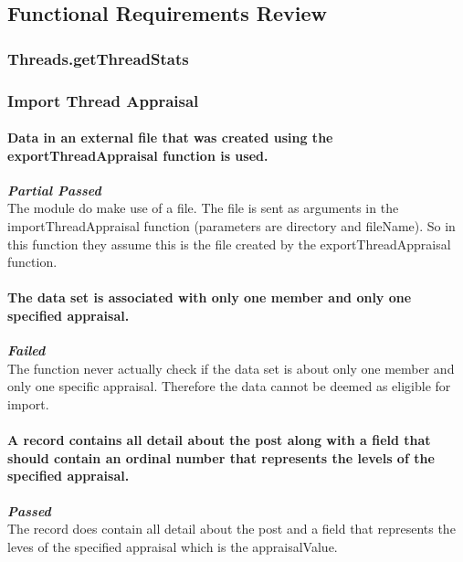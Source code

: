 \subsection{Functional Requirements Review}
\subsubsection{Threads.getThreadStats}








\subsubsection{Import Thread Appraisal}
\paragraph{Data in an external file that was created using the exportThreadAppraisal function is used.\\} 
\textbf{\emph{Partial Passed}} \\
The module do make use of a file. The file is sent as arguments in the importThreadAppraisal function (parameters are directory and  fileName). So in this function they assume this is the file created by the exportThreadAppraisal function.
\par

\paragraph{The data set is associated with only one member and only one specified appraisal.\\}
\textbf{\emph{Failed}} \\
The function never actually check if the data set is about only one member and only one specific appraisal. Therefore the data cannot be deemed as eligible for import.
\par

\paragraph{A record contains all detail about the post along with a field that should contain an ordinal number that represents the levels of the specified appraisal.\\}
\textbf{\emph{Passed}} \\
The record does contain all detail about the post and a field that represents the leves of the specified appraisal which is the appraisalValue.
\par

